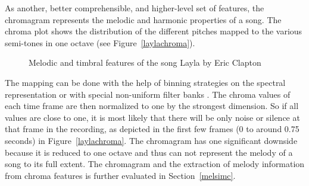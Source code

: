 As another, better comprehensible, and higher-level set of features, the chromagram represents the melodic and harmonic properties of a song. The chroma plot shows the distribution of the different pitches mapped to the various semi-tones in one octave (see Figure~\ref{laylachroma}). 
\begin{figure}[htbp]
	\centering
	\caption{Melodic and timbral features of the song Layla by Eric Clapton}
	\label{fig:feat1}
\end{figure}
\FloatBarrier
\noindent The mapping can be done with the help of binning strategies on the spectral representation or with special non-uniform filter banks \cite[p. 153]{musicdata}. The chroma values of each time frame are then normalized to one by the strongest dimension. So if all values are close to one, it is most likely that there will be only noise or silence at that frame in the recording, as depicted in the first few frames (0 to around 0.75 seconds) in Figure~\ref{laylachroma}. The chromagram has one significant downside because it is reduced to one octave and thus can not represent the melody of a song to its full extent. The chromagram and the extraction of melody information from chroma features is further evaluated in Section~\ref{melsimc}.\\
